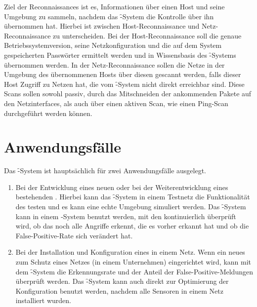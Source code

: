Ziel der Reconnaissances ist es, Informationen über einen Host und seine Umgebung
zu sammeln, nachdem das \f-System die Kontrolle über ihn übernommen hat.
Hierbei ist zwischen Host-Reconnaissance und Netz-Reconnaissance zu unterscheiden.
Bei der Host-Reconnaissance soll die genaue Betriebssystemversion, seine
Netzkonfiguration und die auf dem System gespeicherten Passwörter ermittelt
werden und in Wissensbasis des \f-Systems übernommen werden.
In der Netz-Reconnaissance sollen die Netze in der Umgebung des übernommenen
Hosts über diesen gescannt werden, falls dieser Host
Zugriff zu Netzen hat, die vom \f-System nicht direkt erreichbar sind.
Diese Scans sollen sowohl passiv, durch das Mitschneiden der ankommenden Pakete auf
den Netzinterfaces, als auch über einen aktiven Scan, wie einen
Ping-Scan durchgeführt werden können.

\section{Anwendungsfälle}
\label{chp:objectives-anwendungsfaelle}
\authors{\HM}{\BK \and \JF \and \DE \and \LM}

Das \f-System ist hauptsächlich für zwei Anwendungsfälle ausgelegt.

\begin{enumerate}
  \item Bei der Entwicklung eines neuen  oder bei der Weiterentwicklung
    eines bestehenden . Hierbei kann das \f-System in einem Testnetz
    die Funktionalität des  testen und es kann eine echte Umgebung
    simuliert werden.  Das \f-System kann in einem -System benutzt
    werden, mit den kontinuierlich überprüft wird, ob das  noch
    alle Angriffe erkennt, die es vorher erkannt hat und ob die
    False-Positive-Rate sich verändert hat.
  \item Bei der Installation und Konfiguration eines  in einem Netz.
    Wenn ein neues  zum Schutz eines Netzes (\zB in einem Unternehmen)
    eingerichtet wird, kann mit dem \f-System die Erkennungsrate und der Anteil
    der False-Positive-Meldungen überprüft werden. Das \f-System kann auch
    direkt zur Optimierung der Konfiguration benutzt werden, nachdem alle
    Sensoren in einem Netz installiert wurden.
\end{enumerate}

